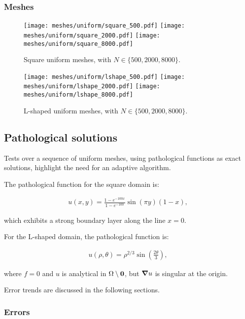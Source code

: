 \newpage
\subsubsection{Meshes}

\begin{figure}[!ht]
	\centering
	\texttt{[image: meshes/uniform/square\_500.pdf]}
	\texttt{[image: meshes/uniform/square\_2000.pdf]}
	\texttt{[image: meshes/uniform/square\_8000.pdf]}
	\caption{Square uniform meshes, with $N \in \{500, 2000, 8000\}$.}
\end{figure}

\begin{figure}[!ht]
	\centering
	\texttt{[image: meshes/uniform/lshape\_500.pdf]}
	\texttt{[image: meshes/uniform/lshape\_2000.pdf]}
	\texttt{[image: meshes/uniform/lshape\_8000.pdf]}
	\caption{L-shaped uniform meshes, with $N \in \{500, 2000, 8000\}$.}
\end{figure}

\newpage
\subsection{Pathological solutions}

Tests over a sequence of uniform meshes, using pathological functions as exact solutions, highlight the need for an adaptive algorithm.

\cite{Antonietti2013} The pathological function for the square domain is:

\begin{gather} \label{pathological_square}
    u(x, y) = \frac{1 - e^{-100x}}{1 - e^{-100}} \sin(\pi y) (1 - x),
\end{gather}

which exhibits a strong boundary layer along the line $x = 0$.

For the L-shaped domain, the pathological function is:

\begin{gather} \label{pathological_lshape}
    u(\rho, \theta) = \rho^{2 / 3} \sin\left(\frac{2 \theta}{3}\right),
\end{gather}

where $f = 0$ and $u$ is analytical in $\Omega \setminus \bm{0}$, but $\bm{\nabla}{u}$ is singular at the origin.

Error trends are discussed in the following sections.

\newpage
\subsubsection{Errors}

